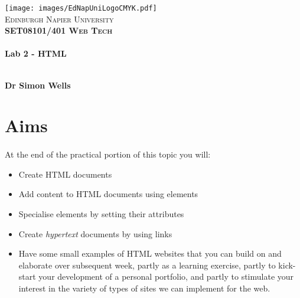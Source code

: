 \documentclass[10pt, a4paper]{article}
\begin{document}

\begin{titlepage}
\vspace*{5cm}
\begin{center}
\texttt{[image: images/EdNapUniLogoCMYK.pdf]}~\\[1cm]

\textsc{\Large Edinburgh Napier University}\\[1.5cm]

\textsc{\LARGE \bfseries SET08101/401 Web Tech}\\[0.5cm]

\hrulefill \\[0.4cm]
{\huge \bfseries Lab 2 - HTML \\[0.4cm] }
\hrulefill \\[1.5cm]

\begin{minipage}{0.4\textwidth}
\begin{flushleft} \large
\textbf{Dr Simon Wells} \\
\end{flushleft}
\end{minipage}

\vfill

\end{center}
\end{titlepage}




%

\section{Aims}
\paragraph{} At the end of the practical portion of this topic you will:

\begin{itemize}
\item Create HTML documents
\item Add content to HTML documents using elements
\item Specialise elements by setting their attributes
\item Create \emph{hypertext} documents by using links
\item Have some small examples of HTML websites that you can build on and elaborate over subsequent week, partly as a learning exercise, partly to kick-start your development of a personal portfolio, and partly to stimulate your interest in the variety of types of sites we can implement for the web.
\end{itemize}
\end{document}
